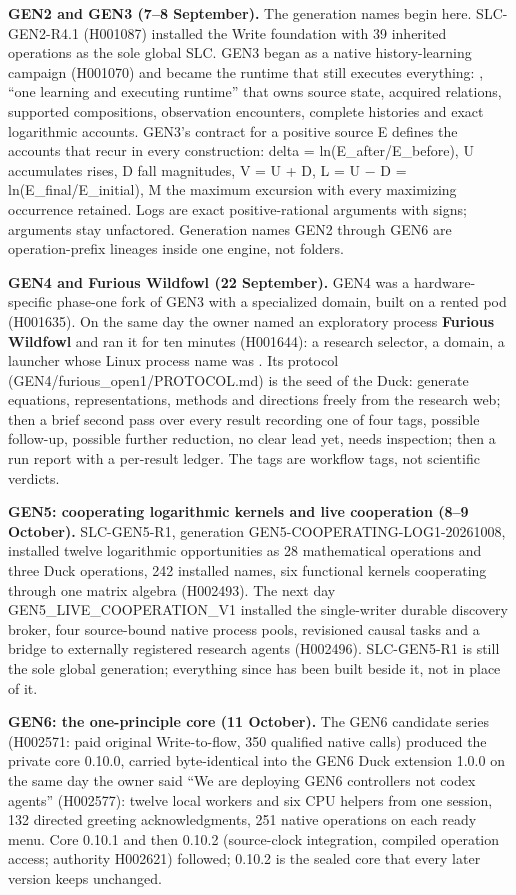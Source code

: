 \textbf{GEN2 and GEN3 (7--8 September).} The generation names begin here. SLC-GEN2-R4.1 (H001087) installed the Write foundation with 39 inherited
operations as the sole global SLC. GEN3 began as a native history-learning campaign (H001070) and became the runtime that still executes
everything: , ``one learning and executing runtime'' that owns source state, acquired relations, supported compositions,
observation encounters, complete histories and exact logarithmic accounts. GEN3's contract for a positive source E defines the accounts that
recur in every construction: delta = ln(E\_after/E\_before), U accumulates rises, D fall magnitudes, V = U + D, L = U − D = ln(E\_final/E\_initial),
M the maximum excursion with every maximizing occurrence retained. Logs are exact positive-rational arguments with signs; arguments stay
unfactored. Generation names GEN2 through GEN6 are operation-prefix lineages inside one engine, not folders.

\textbf{GEN4 and Furious Wildfowl (22 September).} GEN4 was a hardware-specific phase-one fork of GEN3 with a specialized domain, built on a
rented pod (H001635). On the same day the owner named an exploratory process \textbf{Furious Wildfowl} and ran it for ten minutes (H001644): a
research selector, a domain, a launcher whose Linux process name was . Its protocol (GEN4/furious\_open1/PROTOCOL.md) is the
seed of the Duck: generate equations, representations, methods and directions freely from the research web; then a brief second pass over
every result recording one of four tags, possible follow-up, possible further reduction, no clear lead yet, needs inspection; then a run
report with a per-result ledger. The tags are workflow tags, not scientific verdicts.

\textbf{GEN5: cooperating logarithmic kernels and live cooperation (8--9 October).} SLC-GEN5-R1, generation GEN5-COOPERATING-LOG1-20261008, installed
twelve logarithmic opportunities as 28 mathematical operations and three Duck operations, 242 installed names, six functional kernels
cooperating through one matrix algebra (H002493). The next day GEN5\_LIVE\_COOPERATION\_V1 installed the single-writer durable discovery broker,
four source-bound native process pools, revisioned causal tasks and a bridge to externally registered research agents (H002496). SLC-GEN5-R1
is still the sole global generation; everything since has been built beside it, not in place of it.

\textbf{GEN6: the one-principle core (11 October).} The GEN6 candidate series (H002571: paid original Write-to-flow, 350 qualified native calls)
produced the private core  0.10.0, carried byte-identical into the GEN6 Duck extension 1.0.0 on the same day the owner
said ``We are deploying GEN6 controllers not codex agents'' (H002577): twelve local workers and six CPU helpers from one session, 132 directed
greeting acknowledgments, 251 native operations on each ready menu. Core 0.10.1 and then 0.10.2 (source-clock integration, compiled
operation access; authority H002621) followed; 0.10.2 is the sealed core that every later version keeps unchanged.

